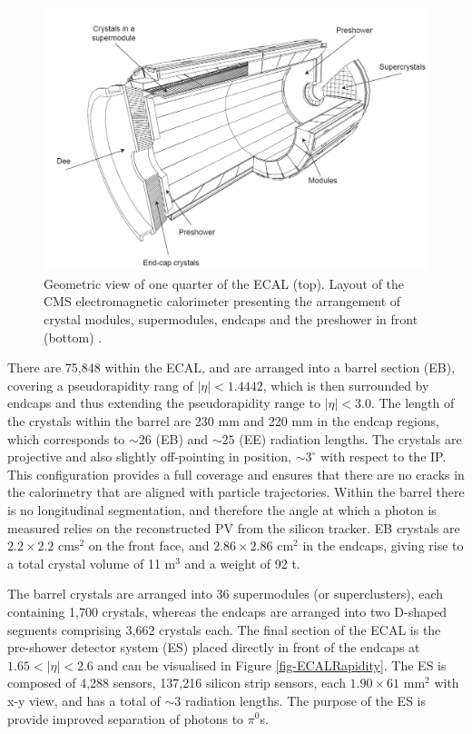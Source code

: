 \begin{figure} [h!] 
\includegraphics[width=\textwidth]{Figures/ECAL.png}
\caption{Geometric view of one quarter of the ECAL (top). Layout of the CMS electromagnetic calorimeter presenting the arrangement of crystal modules, supermodules, endcaps and the preshower in front (bottom) \cite{CMSexperiment}.}
\label{fig-ECAL}
\end{figure}

There are 75,848 within the ECAL, and are arranged into a barrel section (EB), covering a pseudorapidity rang of $|\eta|<1.4442$, which is then surrounded by endcaps and thus extending the pseudorapidity range to $|\eta|<3.0$. The length of the crystals within the barrel are 230 mm and 220 mm in the endcap regions, which corresponds to $\sim26$ (EB) and $\sim25$ (EE) radiation lengths. The crystals are projective and also slightly off-pointing in position, $\sim3^\circ$ with respect to the IP. This configuration provides a full coverage and ensures that there are no cracks in the calorimetry that are aligned with particle trajectories. Within the barrel there is no longitudinal segmentation, and therefore the angle at which a photon is measured relies on the reconstructed PV from the silicon tracker. EB crystals are $2.2\times2.2$ cms$^2$ on the front face, and $2.86\times2.86$ cm$^2$ in the endcaps, giving rise to a total crystal volume of 11 m$^3$ and a weight of 92 t.

The barrel crystals are arranged into 36 supermodules (or superclusters), each containing 1,700 crystals, whereas the endcaps are arranged into two D-shaped segments comprising 3,662 crystals each. The final section of the ECAL is the pre-shower detector system (ES) placed directly in front of the endcaps at $1.65<|\eta|<2.6$ and can be visualised in Figure \ref{fig-ECALRapidity}. The ES is composed of 4,288 sensors, 137,216 silicon strip sensors, each $1.90\times61$ mm$^2$ with x-y view, and has a total of $\sim3$ radiation lengths. The purpose of the ES is provide improved separation of photons to $\pi^0$s.

